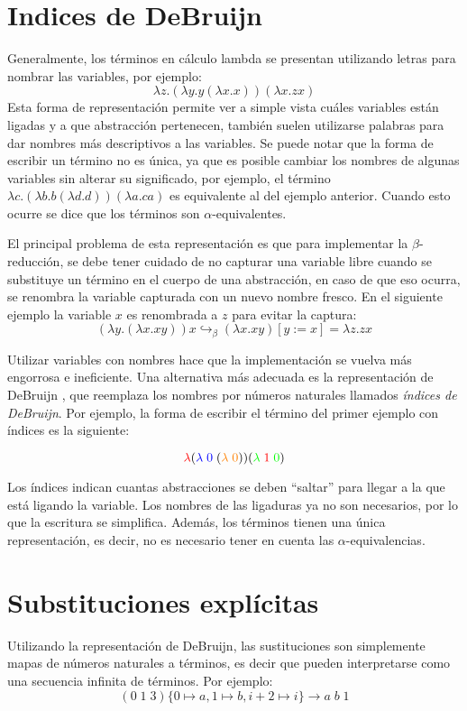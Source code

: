 \documentclass[]{report}
\begin{document}
	\section{Indices de DeBruijn}
	Generalmente, los términos en cálculo lambda se presentan utilizando letras para nombrar las variables, por ejemplo:
	\[ \lambda z. (\lambda y. y (\lambda x. x)) (\lambda x. z x) \]
	Esta forma de representación permite ver a simple vista cuáles variables están ligadas y a que abstracción pertenecen, también suelen utilizarse palabras para dar nombres más descriptivos a las variables.
	Se puede notar que la forma de escribir un término no es única, ya que es posible cambiar los nombres de algunas variables sin alterar su significado, por ejemplo, el término $\lambda c. (\lambda b. b (\lambda d. d)) (\lambda a. c a)$ es equivalente al del ejemplo anterior.
	Cuando esto ocurre se dice que los términos son $\alpha$-equivalentes.
	
	El principal problema de esta representación es que para implementar la $\beta$-reducción, se debe tener cuidado de no capturar una variable libre cuando se substituye un término en el cuerpo de una abstracción, en caso de que eso ocurra, se renombra la variable capturada con un nuevo nombre fresco.
	En el siguiente ejemplo la variable $x$ es renombrada a $z$ para evitar la captura:
	\[ (\lambda y. (\lambda x. x y)) x \hookrightarrow_{\beta} (\lambda x. x y)[y := x] = \lambda z. z x \]
	
	Utilizar variables con nombres hace que la implementación se vuelva más engorrosa e ineficiente.
	Una alternativa más adecuada es la representación de DeBruijn \cite{debrujin_index}, que reemplaza los nombres por números naturales llamados \textit{índices de DeBruijn}.
	Por ejemplo, la forma de escribir el término del primer ejemplo con índices es la siguiente:
	
	\[ \textcolor{red}{\lambda} (\textcolor{blue}{\lambda\; 0} \; (\textcolor{orange}{\lambda\; 0})) (\textcolor{green}{\lambda}\; \textcolor{red}{1} \; \textcolor{green}{0}) \]

	Los índices indican cuantas abstracciones se deben ``saltar'' para llegar a la que está ligando la variable.
	Los nombres de las ligaduras ya no son necesarios, por lo que la escritura se simplifica.
	Además, los términos tienen una única representación, es decir, no es necesario tener en cuenta las $\alpha$-equivalencias.
	
	
	\section{Substituciones explícitas}
	Utilizando la representación de DeBruijn, las sustituciones son simplemente mapas de números naturales a términos, es decir que pueden interpretarse como una secuencia infinita de términos.
	Por ejemplo:
	\[ (0\; 1\; 3)\{0\mapsto a, 1\mapsto b, i+2\mapsto i\} \rightarrow a\; b\; 1 \]
	
\end{document}
